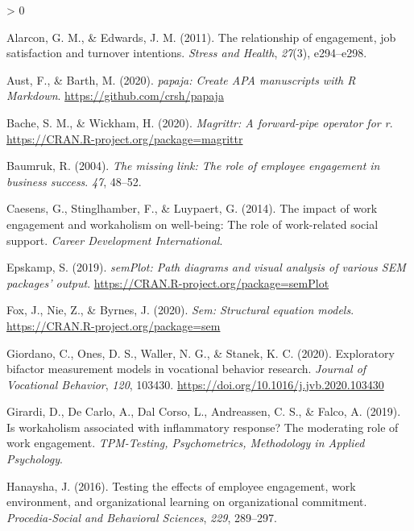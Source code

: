 \documentclass[
  english,
  man]{apa7}
\newlength{\cslhangindent}
\newenvironment{CSLReferences}[2] %
 {%
  \setlength{\parindent}{0pt}
  \ifodd #1 \everypar{\setlength{\hangindent}{\cslhangindent}}\ignorespaces\fi
  \ifnum #2 > 0
  \setlength{\parskip}{#2\baselineskip}
  \fi
 }%
 {}
\begin{document}
\hypertarget{refs}{}
\begin{CSLReferences}{1}{0}
\leavevmode\hypertarget{ref-alarcon2011relationship}{}%
Alarcon, G. M., \& Edwards, J. M. (2011). The relationship of engagement, job satisfaction and turnover intentions. \emph{Stress and Health}, \emph{27}(3), e294--e298.

\leavevmode\hypertarget{ref-R-papaja}{}%
Aust, F., \& Barth, M. (2020). \emph{{papaja}: {Create} {APA} manuscripts with {R Markdown}}. \url{https://github.com/crsh/papaja}

\leavevmode\hypertarget{ref-R-magrittr}{}%
Bache, S. M., \& Wickham, H. (2020). \emph{Magrittr: A forward-pipe operator for r}. \url{https://CRAN.R-project.org/package=magrittr}

\leavevmode\hypertarget{ref-baumruk2004missing}{}%
Baumruk, R. (2004). \emph{The missing link: The role of employee engagement in business success}. \emph{47}, 48--52.

\leavevmode\hypertarget{ref-caesens2014impact}{}%
Caesens, G., Stinglhamber, F., \& Luypaert, G. (2014). The impact of work engagement and workaholism on well-being: The role of work-related social support. \emph{Career Development International}.

\leavevmode\hypertarget{ref-R-semPlot}{}%
Epskamp, S. (2019). \emph{semPlot: Path diagrams and visual analysis of various SEM packages' output}. \url{https://CRAN.R-project.org/package=semPlot}

\leavevmode\hypertarget{ref-R-sem}{}%
Fox, J., Nie, Z., \& Byrnes, J. (2020). \emph{Sem: Structural equation models}. \url{https://CRAN.R-project.org/package=sem}

\leavevmode\hypertarget{ref-giordano_exploratory_2020}{}%
Giordano, C., Ones, D. S., Waller, N. G., \& Stanek, K. C. (2020). Exploratory bifactor measurement models in vocational behavior research. \emph{Journal of Vocational Behavior}, \emph{120}, 103430. \url{https://doi.org/10.1016/j.jvb.2020.103430}

\leavevmode\hypertarget{ref-girardi2019workaholism}{}%
Girardi, D., De Carlo, A., Dal Corso, L., Andreassen, C. S., \& Falco, A. (2019). Is workaholism associated with inflammatory response? The moderating role of work engagement. \emph{TPM-Testing, Psychometrics, Methodology in Applied Psychology}.

\leavevmode\hypertarget{ref-hanaysha2016testing}{}%
Hanaysha, J. (2016). Testing the effects of employee engagement, work environment, and organizational learning on organizational commitment. \emph{Procedia-Social and Behavioral Sciences}, \emph{229}, 289--297.


\end{CSLReferences}
\end{document}
